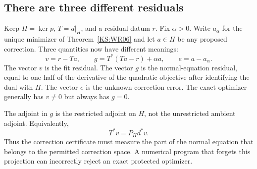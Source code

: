 \subsection{There are three different residuals}
Keep $H=\ker p$, $T=d|_H$, and a residual datum $r$. Fix $\alpha>0$. Write $a_\alpha$ for the unique minimizer of Theorem~\ref{KS:WR06} and let $a\in H$ be any proposed correction. Three quantities now have different meanings:
\[
 v=r-Ta,\qquad
 g=T^*(Ta-r)+\alpha a,\qquad
 e=a-a_\alpha.
\]
The vector $v$ is the fit residual. The vector $g$ is the normal-equation residual, equal to one half of the derivative of the quadratic objective after identifying the dual with $H$. The vector $e$ is the unknown correction error. The exact optimizer generally has $v\ne0$ but always has $g=0$.

The adjoint in $g$ is the restricted adjoint on $H$, not the unrestricted ambient adjoint. Equivalently,
\[
 T^*v=P_Hd^*v.
\]
Thus the correction certificate must measure the part of the normal equation that belongs to the permitted correction space. A numerical program that forgets this projection can incorrectly reject an exact protected optimizer.

